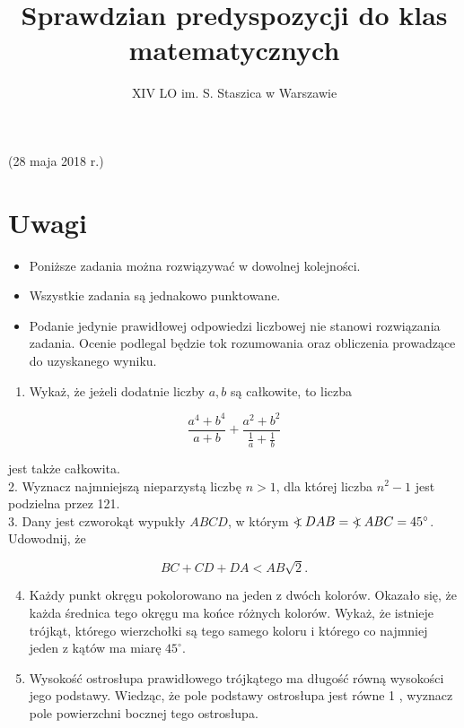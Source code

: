 \documentclass[10pt]{article}
\title{Sprawdzian predyspozycji do klas matematycznych }
\author{XIV LO im. S. Staszica w Warszawie}
\date{}
\newcommand\Varangle{\mathop{{<\!\!\!\!\!\text{\small)}}\:}\nolimits}
\begin{document}
\maketitle
(28 maja 2018 r.)

\section*{Uwagi}
\begin{itemize}
  \item Poniższe zadania można rozwiązywać w dowolnej kolejności.
  \item Wszystkie zadania są jednakowo punktowane.
  \item Podanie jedynie prawidłowej odpowiedzi liczbowej nie stanowi rozwiązania zadania. Ocenie podlegal będzie tok rozumowania oraz obliczenia prowadzące do uzyskanego wyniku.
\end{itemize}

\begin{enumerate}
  \item Wykaż, że jeżeli dodatnie liczby \(a, b\) są całkowite, to liczba
\end{enumerate}

\[
\frac{a^{4}+b^{4}}{a+b}+\frac{a^{2}+b^{2}}{\frac{1}{a}+\frac{1}{b}}
\]

jest także całkowita.\\
2. Wyznacz najmniejszą nieparzystą liczbę \(n>1\), dla której liczba \(n^{2}-1\) jest podzielna przez 121.\\
3. Dany jest czworokąt wypukły \(A B C D\), w którym \(\Varangle D A B=\Varangle A B C=45^{\circ}\). Udowodnij, że

\[
B C+C D+D A<A B \sqrt{2} .
\]

\begin{enumerate}
  \setcounter{enumi}{3}
  \item Każdy punkt okręgu pokolorowano na jeden z dwóch kolorów. Okazało się, że każda średnica tego okręgu ma końce różnych kolorów. Wykaż, że istnieje trójkąt, którego wierzchołki są tego samego koloru i którego co najmniej jeden z kątów ma miarę \(45^{\circ}\).
  \item Wysokość ostrosłupa prawidłowego trójkątego ma długość równą wysokości jego podstawy. Wiedząc, że pole podstawy ostrosłupa jest równe 1 , wyznacz pole powierzchni bocznej tego ostrosłupa.
\end{enumerate}
\end{document}
